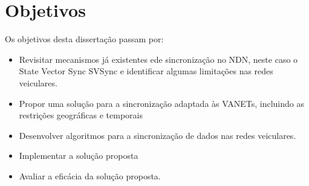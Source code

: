 \section{Objetivos}
\label{sec:objetivos}
Os objetivos desta dissertação passam por:
\begin{itemize}
    \item Revisitar mecanismos já existentes ede sincronização no \gls{NDN}, neste caso o State Vector Sync \gls{SVSync} e identificar algumas limitações nas redes veiculares.
    \item Propor uma solução para a sincronização adaptada às \gls{VANETs}, incluindo as restrições geográficas e temporais
    \item Desenvolver  algoritmos para a sincronização de dados nas redes veiculares.
    \item Implementar a solução proposta
    \item Avaliar a eficácia da solução proposta.

\end{itemize}



